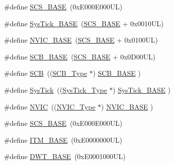 \begin{DoxyCompactItemize}
\item 
\#define \mbox{\hyperlink{group___c_m_s_i_s__core__base_ga3c14ed93192c8d9143322bbf77ebf770}{S\+C\+S\+\_\+\+B\+A\+SE}}~(0x\+E000\+E000\+U\+L)
\item 
\#define \mbox{\hyperlink{group___c_m_s_i_s__core__base_ga58effaac0b93006b756d33209e814646}{Sys\+Tick\+\_\+\+B\+A\+SE}}~(\mbox{\hyperlink{group___c_m_s_i_s__core__base_ga3c14ed93192c8d9143322bbf77ebf770}{S\+C\+S\+\_\+\+B\+A\+SE}} +  0x0010\+U\+L)
\item 
\#define \mbox{\hyperlink{group___c_m_s_i_s__core__base_gaa0288691785a5f868238e0468b39523d}{N\+V\+I\+C\+\_\+\+B\+A\+SE}}~(\mbox{\hyperlink{group___c_m_s_i_s__core__base_ga3c14ed93192c8d9143322bbf77ebf770}{S\+C\+S\+\_\+\+B\+A\+SE}} +  0x0100\+U\+L)
\item 
\#define \mbox{\hyperlink{group___c_m_s_i_s__core__base_gad55a7ddb8d4b2398b0c1cfec76c0d9fd}{S\+C\+B\+\_\+\+B\+A\+SE}}~(\mbox{\hyperlink{group___c_m_s_i_s__core__base_ga3c14ed93192c8d9143322bbf77ebf770}{S\+C\+S\+\_\+\+B\+A\+SE}} +  0x0\+D00\+U\+L)
\item 
\#define \mbox{\hyperlink{group___c_m_s_i_s__core__base_gaaaf6477c2bde2f00f99e3c2fd1060b01}{S\+CB}}~((\mbox{\hyperlink{struct_s_c_b___type}{S\+C\+B\+\_\+\+Type}}       $\ast$)     \mbox{\hyperlink{group___c_m_s_i_s__core__base_gad55a7ddb8d4b2398b0c1cfec76c0d9fd}{S\+C\+B\+\_\+\+B\+A\+SE}}      )
\item 
\#define \mbox{\hyperlink{group___c_m_s_i_s__core__base_gacd96c53beeaff8f603fcda425eb295de}{Sys\+Tick}}~((\mbox{\hyperlink{struct_sys_tick___type}{Sys\+Tick\+\_\+\+Type}}   $\ast$)     \mbox{\hyperlink{group___c_m_s_i_s__core__base_ga58effaac0b93006b756d33209e814646}{Sys\+Tick\+\_\+\+B\+A\+SE}}  )
\item 
\#define \mbox{\hyperlink{group___c_m_s_i_s__core__base_gac8e97e8ce56ae9f57da1363a937f8a17}{N\+V\+IC}}~((\mbox{\hyperlink{struct_n_v_i_c___type}{N\+V\+I\+C\+\_\+\+Type}}      $\ast$)     \mbox{\hyperlink{group___c_m_s_i_s__core__base_gaa0288691785a5f868238e0468b39523d}{N\+V\+I\+C\+\_\+\+B\+A\+SE}}     )
\item 
\#define \mbox{\hyperlink{group___c_m_s_i_s__core__base_ga3c14ed93192c8d9143322bbf77ebf770}{S\+C\+S\+\_\+\+B\+A\+SE}}~(0x\+E000\+E000\+U\+L)
\item 
\#define \mbox{\hyperlink{group___c_m_s_i_s__core__base_gadd76251e412a195ec0a8f47227a8359e}{I\+T\+M\+\_\+\+B\+A\+SE}}~(0x\+E0000000\+U\+L)
\item 
\#define \mbox{\hyperlink{group___c_m_s_i_s__core__base_gafdab534f961bf8935eb456cb7700dcd2}{D\+W\+T\+\_\+\+B\+A\+SE}}~(0x\+E0001000\+U\+L)

\end{DoxyCompactItemize}
